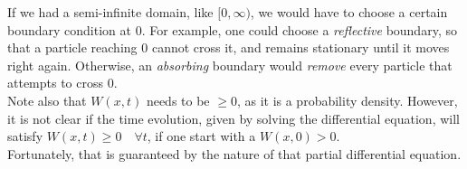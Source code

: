 \documentclass[../template.tex]{subfiles}
\begin{document}
If we had a semi-infinite domain, like $[0, \infty)$, we would have to choose a certain boundary condition at $0$. For example, one could choose a \textit{reflective} boundary, so that a particle reaching $0$ cannot cross it, and remains stationary until it moves right again. Otherwise, an \textit{absorbing} boundary would \textit{remove} every particle that attempts to cross $0$.\\

Note also that $W(x,t)$ needs to be $\geq 0$, as it is a probability density. However, it is not clear if the time evolution, given by solving the differential equation, will satisfy $W(x,t) \geq 0 \quad \forall t$, if one start with a $W(x,0) > 0$.\\
Fortunately, that is guaranteed by the nature of that partial differential equation.\\
\end{document}
